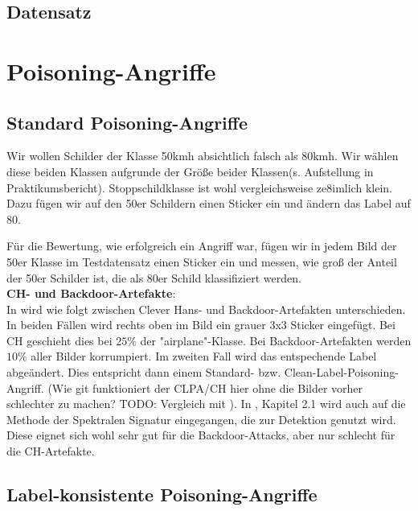 \documentclass[twoside, 12pt,a4paper]{article}
\numberwithin{equation}{section}
\begin{document}
	\subsection{Datensatz}
	
	
	
	\section{Poisoning-Angriffe} \label{chapter_poisoningattacks}
	\subsection{Standard Poisoning-Angriffe}
	Wir wollen Schilder der Klasse 50kmh absichtlich falsch als 80kmh. Wir wählen diese beiden Klassen aufgrunde der Größe beider Klassen(s. Aufstellung in Praktikumsbericht). Stoppschildklasse ist wohl vergleichsweise ze8imlich klein.\\
	
	Dazu fügen wir auf den 50er Schildern einen Sticker ein und ändern das Label auf 80.
	
	Für die Bewertung, wie erfolgreich ein Angriff war, fügen wir in jedem Bild der 50er Klasse im Testdatensatz einen Sticker ein und messen, wie groß der Anteil der 50er Schilder ist, die als 80er Schild klassifiziert werden.\\
	
	\noindent \textbf{CH- und Backdoor-Artefakte}:\\
	In \cite{imagenet_unhansed_v2} wird wie folgt zwischen Clever Hans- und Backdoor-Artefakten unterschieden. In beiden Fällen wird rechts oben im Bild ein grauer 3x3 Sticker eingefügt.
	Bei CH geschieht dies bei $25 \%$ der "airplane"-Klasse. Bei Backdoor-Artefakten werden $10 \%$ aller Bilder korrumpiert. Im zweiten Fall wird das entspechende Label abgeändert. Dies entspricht dann einem Standard- bzw. Clean-Label-Poisoning-Angriff. (Wie git funktioniert der CLPA/CH hier ohne die Bilder vorher schlechter zu machen? TODO: Vergleich mit \cite{labelconsistent}). In \cite{imagenet_unhansed_v2}, Kapitel 2.1 wird auch auf die Methode der Spektralen Signatur \cite{spectral_signatures} eingegangen, die zur Detektion genutzt wird. Diese eignet sich wohl sehr gut für die Backdoor-Attacks, aber nur schlecht für die CH-Artefakte.
	
	
	\subsection{Label-konsistente Poisoning-Angriffe}
\end{document}

